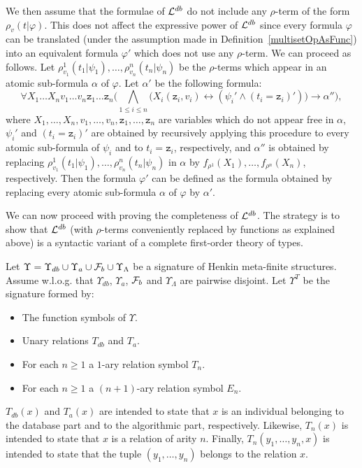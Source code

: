 \documentclass[preprint,11pt]{elsarticle}
\theoremstyle{definition}
\theoremstyle{remark}
\begin{document}
We then assume that the formulae of ${\cal L}^{db}$ do not include any $\rho$-term of the form $\rho_{v}(t|\varphi)$. This does not affect the expressive power of ${\cal L}^{db}$ since every formula $\varphi$ can be translated (under the assumption made in Definition~\ref{multisetOpAsFunc}) into an equivalent formula $\varphi'$ which does not use any $\rho$-term. We can proceed as follows. Let $\rho^1_{v_1}(t_1|\psi_1), \ldots, \rho^n_{v_n}(t_n|\psi_n)$ be the $\rho$-terms which appear in an atomic sub-formula $\alpha$ of $\varphi$. Let $\alpha'$ be the following formula:
\[\forall X_1 \ldots X_n v_1 \ldots v_n \mathtt{z}_1 \ldots \mathtt{z}_n \Big( \bigwedge_{1 \leq i \leq n} \big(X_i(\mathtt{z}_i, v_i) \leftrightarrow (\psi_i' \wedge (t_i = \texttt{z}_i)')\big) \rightarrow \alpha'' \Big),\]
where $X_1, \ldots, X_n, v_1, \ldots, v_n, \mathtt{z}_1, \ldots, \mathtt{z}_n$ are variables which do not appear free in $\alpha$, $\psi_i'$ and $(t_i = \texttt{z}_i)'$ are obtained by recursively applying this procedure to every atomic sub-formula of $\psi_i$ and to $t_i = \mathtt{z}_i$, respectively, and $\alpha''$ is obtained by replacing $\rho^1_{v_1}(t_1|\psi_1), \ldots, \rho^n_{v_n}(t_n|\psi_n)$ in $\alpha$ by $f_{\rho^1}(X_1), \ldots,f_{\rho^n}(X_n)$, respectively.  Then the formula $\varphi'$ can be defined as the formula obtained by replacing every atomic sub-formula $\alpha$ of $\varphi$ by $\alpha'$.

We can now proceed with proving the completeness of ${\cal L}^{db}$. The strategy is to show that ${\cal L}^{db}$ (with $\rho$-terms conveniently replaced by functions as explained above) is a syntactic variant of a complete first-order theory of types. 

Let $\Upsilon = \Upsilon_{db} \cup \Upsilon_a \cup {\cal F}_b \cup \Upsilon_{\Lambda}$ be a signature of Henkin meta-finite structures. Assume w.l.o.g. that $\Upsilon_{db}$, $\Upsilon_a$, ${\cal F}_b$ and $\Upsilon_\Lambda$ are pairwise disjoint. Let $\Upsilon^T$ be the signature formed by:
\begin{itemize}
\item The function symbols of $\Upsilon$. 
\item Unary relations $T_{db}$ and $T_a$.
\item For each $n \geq 1$ a $1$-ary relation symbol $T_n$. 
\item For each $n \geq 1$ a $(n+1)$-ary relation symbol $E_n$. 
\end{itemize} 
$T_{db}(x)$ and $T_a(x)$ are intended to state that $x$ is an individual belonging to the database part and to the algorithmic part, respectively. Likewise, $T_n(x)$ is intended to state that $x$ is a relation of arity $n$. Finally, $T_n(y_1, \ldots, y_n, x)$ is intended to state that the tuple $(y_1, \ldots, y_n)$ belongs to the relation $x$.  
\end{document}
